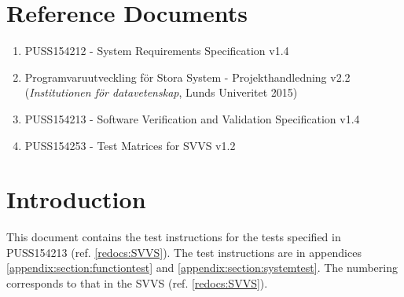 \documentclass[a4paper]{article}
\begin{document}
\setcounter{tocdepth}{2}
\tableofcontents
\newpage
{}


\section{Reference Documents}
\begin{enumerate}
\item PUSS154212 - System Requirements Specification v1.4 \label{refdocs:srs} 
\item Programvaruutveckling för Stora System - Projekthandledning v2.2 \newline (\textit{Institutionen för datavetenskap}, Lunds Univeritet 2015) \label{refdocs:projekthandledning}
\item PUSS154213 - Software Verification and Validation Specification v1.4 \label{redocs:SVVS}
\item PUSS154253 - Test Matrices for SVVS v1.2 \label{refdocs:matrices}
\end{enumerate}

\section{Introduction}
This document contains the test instructions for the tests specified in PUSS154213 (ref. \ref{redocs:SVVS}). The test instructions are in appendices \ref{appendix:section:functiontest} and \ref{appendix:section:systemtest}. The numbering corresponds to that in the SVVS (ref. \ref{redocs:SVVS}).
\end{document}
